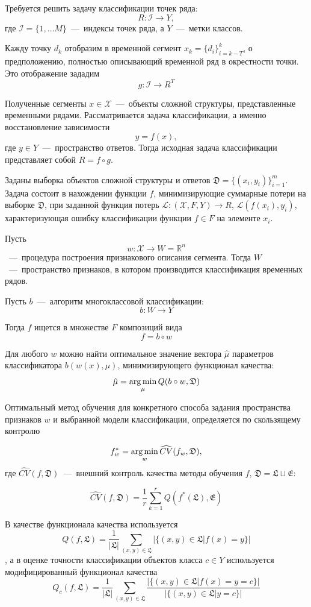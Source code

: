 \documentclass[12pt, twoside]{article}
\begin{document}
Требуется решить задачу классификации точек ряда: $$R:\mathcal{I}\rightarrow Y,$$ где $\mathcal{I}=\{1,\ldots M\}$~---~индексы точек ряда, а $Y$~---~метки классов.

Кажду точку $d_k$ отобразим в временной сегмент $x_k=\{d_i\}_{i=k-T}^k$, о предположению, полностью описывающий временной ряд в окрестности точки. Это отображение зададим $$g:\mathcal{I}\rightarrow R^T$$ 

Полученные сегменты $x\in \mathcal{X}$~---~объекты сложной структуры, представленные временными рядами. Рассматривается задача классификации, а именно восстановление зависимости $$y=f(x),$$ где $y\in Y$~---~пространство ответов. Тогда исходная задача классификации представляет собой $R=f\circ g$.

Заданы выборка объектов сложной структуры и ответов $\mathfrak{D}=\{(x_i,y_i)\}_{i=1}^m$. Задача состоит в нахождении функции $f$, минимизирующие суммарные потери на выборке $\mathfrak{D}$, при заданной функция потерь $\mathscr{L}:(\mathcal{X},F,Y)\rightarrow R$, $\mathscr{L}(f(x_i),y_i)$, характеризующая ошибку классификации функции $f\in F$ на элементе $x_i$. 

Пусть $$w:\mathcal{X}\rightarrow W = \mathds{R}^n$$~---~процедура построения признакового описания сегмента. Тогда $W$~---~пространство признаков, в котором производится классификация временных рядов.

Пусть $b$~---~алгоритм многоклассовой классификации: $$b:W\rightarrow Y$$

Тогда $f$ ищется в множестве $F$ композиций вида $$f=b\circ w$$

Для любого $w$ можно найти оптимальное значение вектора $\hat\mu$ параметров классификатора $b(w(x),\mu)$, минимизирующего функционал качества: $$\hat\mu=\argmin_\mu Q(b\circ w,\mathfrak{D})$$

Оптимальный метод обучения для конкретного способа задания пространства признаков $w$ и выбранной модели классификации, определяется по скользящему контролю

$$f_{w}^*=\argmin\limits_{w}\widehat{CV}(f_{w},\mathfrak{D}),$$ где $\widehat{CV}(f,\mathfrak{D})$~---~внешний контроль качества методы обучения $f$, $\mathfrak{D}=\mathfrak{L}\sqcup\mathfrak{E}$:
 
$$\widehat{CV}(f, \mathfrak{D})=\frac{1}{r}\sum\limits_{k=1}^r Q(f^*(\mathfrak{L}),\mathfrak{E})$$

В качестве функционала качества используется $$Q(f,\mathfrak{L})=\frac{1}{|\mathfrak{L}|}\sum\limits_{(x,y)\in\mathfrak{L}}|\{(x,y)\in\mathfrak{L}|f(x)=y\}|$$, а в оценке точности классификации объектов класса $c\in Y$ используется модифицированный функционал качества $$Q_c(f,\mathfrak{L})=\frac{1}{|\mathfrak{L}|}\sum\limits_{(x,y)\in\mathfrak{L}}\frac{|\{(x,y)\in\mathfrak{L}|f(x)=y=c\}|}{|\{(x,y)\in\mathfrak{L}|y=c\}|}$$
\end{document}
